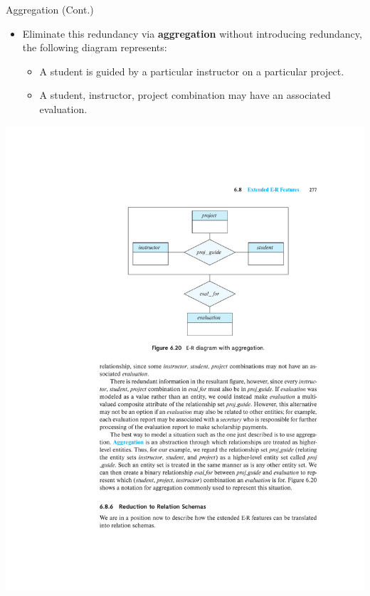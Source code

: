 \documentclass{beamer}
\begin{document}
\begin{frame}{Aggregation (Cont.)}
    \begin{itemize}
        \item Eliminate this redundancy via \textbf{aggregation} without introducing redundancy, the following diagram represents:
        \begin{itemize}
            \item A student is guided by a particular instructor on a particular project.
            \item A student, instructor, project combination may have an associated evaluation.
        \end{itemize}
    \end{itemize}
    \centering
    \includegraphics[trim={2cm 15cm 2cm 4cm}, clip, width=\textwidth]{figures/aggregation_relationships}
\end{frame}
\end{document}
